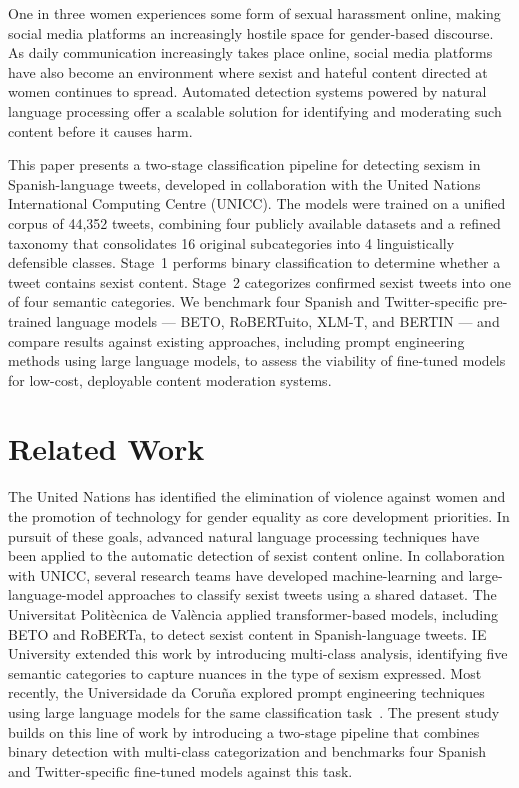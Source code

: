 \documentclass[runningheads]{llncs}
\begin{document}
One in three women experiences some form of sexual harassment online, making social
media platforms an increasingly hostile space for gender-based discourse. As daily
communication increasingly takes place online, social media platforms have also become
an environment where sexist and hateful content directed at women continues to spread.
Automated detection systems powered by natural language processing offer a scalable
solution for identifying and moderating such content before it causes harm.

This paper presents a two-stage classification pipeline for detecting sexism in
Spanish-language tweets, developed in collaboration with the United Nations
International Computing Centre (UNICC). The models were trained on a unified corpus
of 44,352 tweets, combining four publicly available datasets and a refined taxonomy
that consolidates 16 original subcategories into 4 linguistically defensible classes.
Stage~1 performs binary classification to determine whether a tweet contains sexist
content. Stage~2 categorizes confirmed sexist tweets into one of four semantic
categories. We benchmark four Spanish and Twitter-specific pre-trained language
models --- BETO, RoBERTuito, XLM-T, and BERTIN --- and compare results against
existing approaches, including prompt engineering methods using large language models,
to assess the viability of fine-tuned models for low-cost, deployable content moderation
systems.

\section{Related Work}

The United Nations has identified the elimination of violence against women and the
promotion of technology for gender equality as core development priorities. In pursuit
of these goals, advanced natural language processing techniques have been applied to
the automatic detection of sexist content online. In collaboration with UNICC, several
research teams have developed machine-learning and large-language-model approaches
to classify sexist tweets using a shared dataset. The Universitat Polit\`ecnica de
Val\`encia applied transformer-based models, including BETO and RoBERTa, to detect
sexist content in Spanish-language tweets. IE University extended this work by
introducing multi-class analysis, identifying five semantic categories to capture nuances
in the type of sexism expressed. Most recently, the Universidade da Coru\~na explored
prompt engineering techniques using large language models for the same classification
task~\cite{limaylla2025}. The present study builds on this line of work by introducing
a two-stage pipeline that combines binary detection with multi-class categorization and
benchmarks four Spanish and Twitter-specific fine-tuned models against this task.
\end{document}
